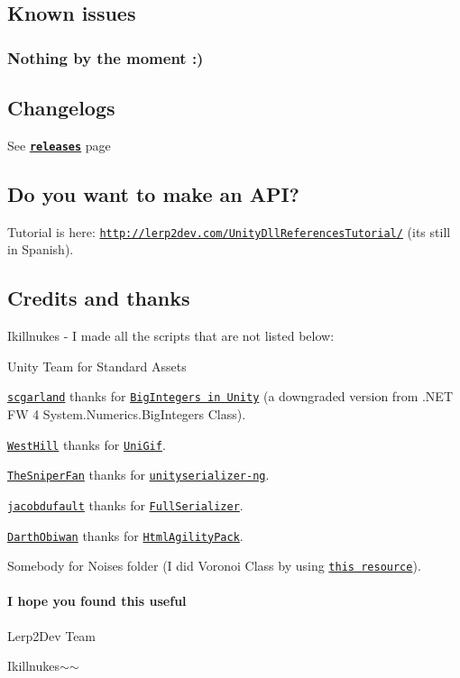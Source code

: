 \subsection*{Known issues}

\subsubsection*{Nothing by the moment \+:)}

\subsection*{Changelogs}

See {\bfseries \href{https://github.com/Lerp2Dev/Lerp2API/releases}{\tt releases}} page

\subsection*{Do you want to make an A\+PI?}

Tutorial is here\+: \href{http://lerp2dev.com/UnityDllReferencesTutorial/}{\tt http\+://lerp2dev.\+com/\+Unity\+Dll\+References\+Tutorial/} (it\textquotesingle{}s still in Spanish).

\subsection*{Credits and thanks}

Ikillnukes -\/ I made all the scripts that are not listed below\+:

Unity Team for Standard Assets

\href{https://www.codeplex.com/site/users/view/scgarland}{\tt scgarland} thanks for \href{http://biginteger.codeplex.com/}{\tt Big\+Integers in Unity} (a downgraded version from .N\+ET FW 4 System.\+Numerics.\+Big\+Integers Class).

\href{http://forum.unity3d.com/members/westhill.145073/}{\tt West\+Hill} thanks for \href{http://forum.unity3d.com/threads/unigif-gif-image-decoder-for-unity-now-available-for-free-on-github.290126/}{\tt Uni\+Gif}.

\href{https://gitgud.io/TheSniperFan}{\tt The\+Sniper\+Fan} thanks for \href{https://gitgud.io/TheSniperFan/unityserializer-ng}{\tt unityserializer-\/ng}.

\href{https://github.com/jacobdufault}{\tt jacobdufault} thanks for \href{https://github.com/jacobdufault/fullserializer}{\tt Full\+Serializer}.

\href{https://www.codeplex.com/site/users/view/DarthObiwan}{\tt Darth\+Obiwan} thanks for \href{https://htmlagilitypack.codeplex.com/}{\tt Html\+Agility\+Pack}.

Somebody for Noises folder (I did Voronoi Class by using \href{https://en.wikipedia.org/wiki/Voronoi_diagram}{\tt this resource}).

\paragraph*{I hope you found this useful}

Lerp2\+Dev Team

Ikillnukes$\sim$$\sim$ 